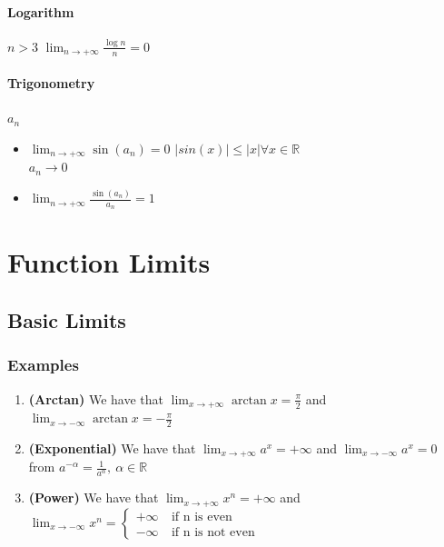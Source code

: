 \documentclass[a4paper]{report}
\begin{document}
\subsubsection{\textbf{Logarithm}}
 $n>3$  $\lim_{n \to +\infty} \frac{\log n}{n} = 0$
\subsubsection{\textbf{Trigonometry}}
 $ a_{n} $ \\
\begin{itemize}
    \item $\lim_{n \to +\infty} \sin \left ( a_{n} \right ) = 0$  $\left | sin\left ( x \right ) \right |\leq \left | x \right | \forall x\in\mathbb{R}$\\  $ a_{n} \rightarrow 0$
    \item $\lim_{n \to +\infty} \frac{\sin\left (a_{n} \right )}{a_{n}} = 1$ 
\end{itemize}
\chapter{\textbf{Function Limits}}
\section{\textbf{Basic Limits}}
\subsection{\textbf{Examples}}
\begin{enumerate}
    \item \textbf{(Arctan)} We have that $\lim_{x\rightarrow +\infty}\arctan x = \frac{\pi}{2}$ and $\lim_{x\rightarrow -\infty}\arctan x = -\frac{\pi}{2}$
    \item \textbf{(Exponential)} We have that $\lim_{x\rightarrow +\infty} a^{x} = +\infty$ and $ \lim_{x\rightarrow -\infty} a^{x} = 0 $ from $a^{-\alpha } = \frac{1}{a^{\alpha }},\ \alpha \in\mathbb{R}$
    \item \textbf{(Power)} We have that $\lim_{x\rightarrow +\infty} x^{n} = +\infty$ and \\ $ \lim_{x\rightarrow -\infty}x^{n}=\left\{\begin{matrix}
+\infty &\ \text{if n is even} \\ 
-\infty &\ \text{if n is not even}
\end{matrix}\right.$
\end{enumerate}
\end{document}
